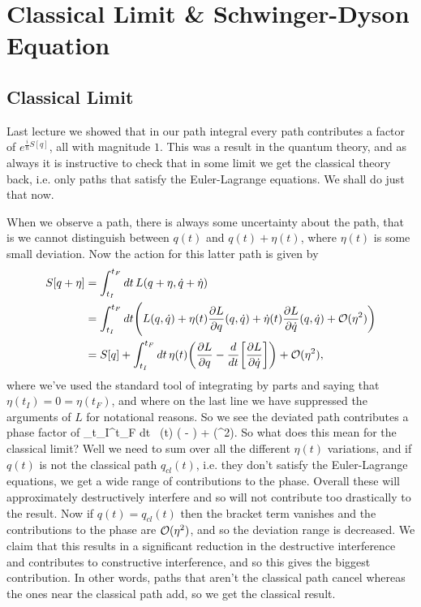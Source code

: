 \chapter{Classical Limit \& Schwinger-Dyson Equation}

\section{Classical Limit}

Last lecture we showed that in our path integral every path contributes a factor of $e^{\frac{i}{\hbar}S[q]}$, all with magnitude $1$. This was a result in the quantum theory, and as always it is instructive to check that in some limit we get the classical theory back, i.e. only paths that satisfy the Euler-Lagrange equations. We shall do just that now. 

When we observe a path, there is always some uncertainty about the path, that is we cannot distinguish between $q(t)$ and $q(t)+\eta(t)$, where $\eta(t)$ is some small deviation. Now the action for this latter path is given by 
\begin{equation*}
    \begin{split}
        S[q+\eta] & = \int_{t_I}^{t_F} dt \, L(q+\eta, \dot{q}+\dot{\eta}) \\
        & = \int_{t_I}^{t_F} dt \Bigg( L(q,\dot{q}) + \eta(t) \frac{\partial L}{\partial q}(q,\dot{q}) + \dot{\eta}(t) \frac{\partial L}{\partial \dot{q}}(q,\dot{q}) + \mathcal{O}(\eta^2)\bigg) \\
        & = S[q] + \int_{t_I}^{t_F} dt \, \eta(t) \bigg( \frac{\partial L}{\partial q} -\frac{d}{dt} \bigg[\frac{\partial L}{\partial \dot{q}}\bigg]\bigg) + \mathcal{O}(\eta^2),
    \end{split}
\end{equation*}
where we've used the standard tool of integrating by parts and saying that $\eta(t_I)=0=\eta(t_F)$, and where on the last line we have suppressed the arguments of $L$ for notational reasons. So we see the deviated path contributes a phase factor of 
\bse 
    \int_{t_I}^{t_F} dt \, \eta(t) \bigg(  - \bigg) + \cO(\eta^2).
\ese 
So what does this mean for the classical limit? Well we need to sum over all the different $\eta(t)$ variations, and if $q(t)$ is not the classical path $q_{cl}(t)$, i.e. they don't satisfy the Euler-Lagrange equations, we get a wide range of contributions to the phase. Overall these will approximately destructively interfere and so will not contribute too drastically to the result. Now if $q(t)=q_{cl}(t)$ then the bracket term vanishes and the contributions to the phase are $\mathcal{O}(\eta^2)$, and so the deviation range is decreased. We claim that this results in a significant reduction in the destructive interference and contributes to constructive interference, and so this gives the biggest contribution. In other words, paths that aren't the classical path cancel whereas the ones near the classical path add, so we get the classical result. 

